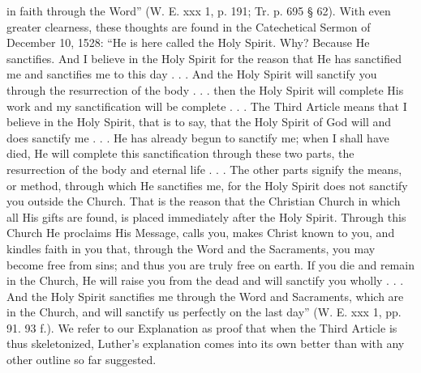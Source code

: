 in faith through the Word” (W. E. xxx 1, p. 191; Tr. p. 695 § 62). With even greater clearness, these thoughts are found in the Catechetical Sermon of December 10, 1528: “He is here called the Holy Spirit. Why? Because He sanctifies. And I believe in the Holy Spirit for the reason that He has sanctified me and sanctifies me to this day . . . And the Holy Spirit will sanctify you through the resurrection of the body . . . then the Holy Spirit will complete His work and my sanctification will be complete . . . The Third Article means that I believe in the Holy Spirit, that is to say, that the Holy Spirit of God will and does sanctify me . . . He has already begun to sanctify me; when I shall have died, He will complete this sanctification through these two parts, the resurrection of the body and eternal life . . . The other parts signify the means, or method, through which He sanctifies me, for the Holy Spirit does not sanctify you outside the Church. That is the reason that the Christian Church in which all His gifts are found, is placed immediately after the Holy Spirit. Through this Church He proclaims His Message, calls you, makes Christ known to you, and kindles faith in you that, through the Word and the Sacraments, you may become free from sins; and thus you are truly free on earth. If you die and remain in the Church, He will raise you from the dead and will sanctify you wholly . . . And the Holy Spirit sanctifies me through the Word and Sacraments, which are in the Church, and will sanctify us perfectly on the last day” (W. E. xxx 1, pp. 91. 93 f.). We refer to our Explanation as proof that when the Third Article is thus skeletonized, Luther’s explanation comes into its own better than with any other outline so far suggested.

